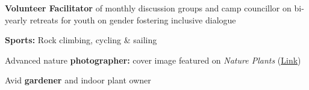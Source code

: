\documentclass[a4paper,10pt]{article}
\begin{document}
\vfill

\begin{description}
  \raggedright
  \item \textbf{Volunteer Facilitator} of monthly discussion groups and camp councillor on bi-yearly retreats for youth on gender fostering inclusive dialogue
  \item \textbf{Sports:} Rock climbing, cycling \& sailing
  \item Advanced nature \textbf{photographer:} cover image featured on \emph{Nature Plants} (\href{https://lauralwd.github.io/photography/}{Link})
  \item Avid \textbf{gardener} and indoor plant owner
\end{description}

\vfill
\end{document}

